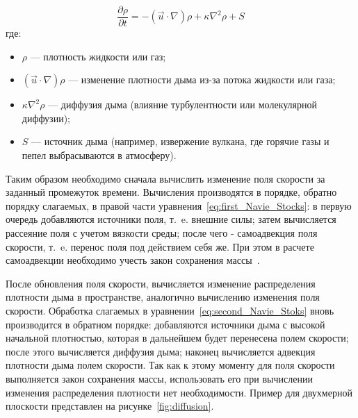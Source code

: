 \begin{equation}
	\label{eq:second_Navie_Stoks}
	\frac{\partial \rho}{\partial t} = -(\vec{u} \cdot \nabla) \rho + \kappa \nabla^2 \rho + S
\end{equation}
где:
\begin{itemize}
	\item \(\rho\) --- плотность жидкости или газ;
	\item \((\vec{u} \cdot \nabla) \rho\) --- изменение плотности дыма из-за потока жидкости или газа;
	\item \(\kappa \nabla^2 \rho\) --- диффузия дыма (влияние турбулентности или молекулярной диффузии);
	\item \(S\) --- источник дыма (например, извержение вулкана, где горячие газы и пепел выбрасываются в атмосферу).
\end{itemize}

Таким образом необходимо сначала вычислить изменение поля скорости за заданный промежуток времени. Вычисления производятся в порядке, обратно порядку слагаемых, в правой части уравнения~\ref{eq:first_Navie_Stocks}: в первую очередь добавляются источники поля, т.~e. внешние силы; затем вычисляется рассеяние поля с учетом вязкости среды; после чего - самоадвекция поля скорости, т.~e. перенос поля под действием себя же. При этом в расчете самоадвекции необходимо учесть закон сохранения массы~\cite{stam}.

После обновления поля скорости, вычисляется изменение распределения плотности дыма в пространстве, аналогично вычислению изменения поля скорости. Обработка слагаемых в уравнении~\ref{eq:second_Navie_Stoks} вновь производится в обратном порядке: добавляются источники дыма с высокой начальной плотностью, которая в дальнейшем будет перенесена полем скорости; после этого вычисляется диффузия дыма; наконец вычисляется адвекция плотности дыма полем скорости. Так как к этому моменту для поля скорости выполняется закон сохранения массы, использовать его при вычислении изменения распределения плотности нет необходимости. Пример для двухмерной плоскости представлен на рисунке~\ref{fig:diffusion}.


